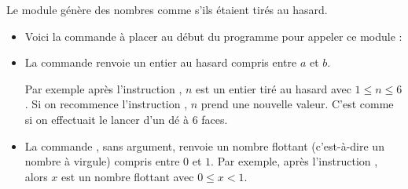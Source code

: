 \documentclass[11pt,class=report,crop=false]{standalone}
\begin{document}
\begin{cours}


Le module  génère des nombres comme s'ils étaient tirés au hasard.
\begin{itemize}
  \item Voici la commande à placer au début du programme pour appeler ce module :
  
  \item La commande  renvoie un entier au hasard compris entre $a$ et $b$.
  
  Par exemple après l'instruction , $n$ est un entier tiré au hasard avec $1 \le n \le 6$.
  Si on recommence l'instruction , $n$ prend une nouvelle valeur. C'est comme si on effectuait le lancer d'un dé à $6$ faces.
  
  \item La commande , sans argument, renvoie un nombre flottant (c'est-à-dire un nombre à virgule) compris  entre $0$ et $1$.  
  Par exemple, après l'instruction , alors $x$ est un nombre flottant avec $0 \le x < 1$.
\end{itemize}


\end{cours}


\end{document}
